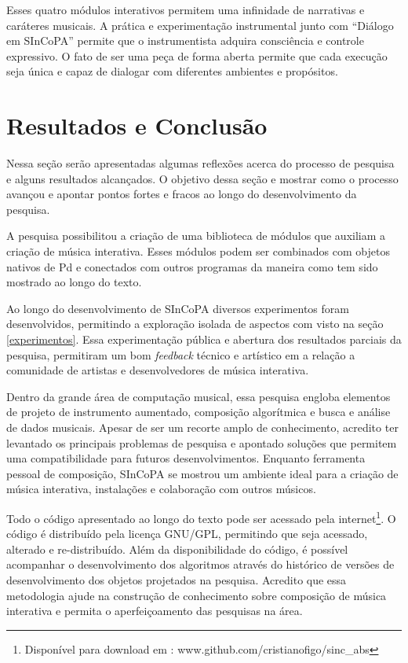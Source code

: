 \documentclass[draft]{ppgmus}
\begin{document}
Esses quatro módulos interativos permitem uma infinidade de narrativas e caráteres musicais.
A prática e experimentação instrumental junto com ``Diálogo em SInCoPA'' permite que o instrumentista 
adquira consciência e controle expressivo. O fato de ser uma peça de forma aberta permite que
cada execução seja única e capaz de dialogar com diferentes ambientes e propósitos.




\chapter{Resultados e Conclusão}
\label{sec:conclusao}

Nessa seção serão apresentadas algumas reflexões acerca
do processo de pesquisa e alguns resultados alcançados.
O objetivo dessa seção e mostrar como o processo avançou
e apontar pontos fortes e fracos ao longo do desenvolvimento da pesquisa.

A pesquisa possibilitou a criação de uma biblioteca de módulos que auxiliam
a criação de música interativa.	Esses módulos podem ser combinados com objetos
nativos de Pd e conectados com outros programas da maneira como tem sido
mostrado ao longo do texto.

Ao longo do desenvolvimento de SInCoPA diversos experimentos foram desenvolvidos,
permitindo a exploração isolada de aspectos com visto na seção \ref{experimentos}.
Essa experimentação pública e abertura dos resultados parciais da pesquisa, permitiram
um bom \textit{feedback} técnico e artístico em a relação a comunidade de 
artistas e desenvolvedores de música interativa.


Dentro da grande área de computação musical, essa pesquisa engloba elementos de projeto
de instrumento aumentado, composição algorítmica e busca e análise de dados musicais.
Apesar de ser um recorte amplo de conhecimento, acredito ter levantado os principais
problemas de pesquisa e apontado soluções que permitem uma compatibilidade para futuros desenvolvimentos.
Enquanto ferramenta pessoal de composição, SInCoPA se mostrou um ambiente ideal
para a criação de música interativa, instalações e colaboração com outros
músicos.

Todo o código apresentado ao longo do texto pode ser acessado pela internet\footnote{Disponível
para download em : www.github.com/cristianofigo/sinc\_abs}. O código é distribuído
pela licença GNU/GPL, permitindo que seja acessado, alterado e re-distribuído.
Além da disponibilidade do código, é possível acompanhar o desenvolvimento dos
algoritmos através do histórico de versões de desenvolvimento dos objetos projetados
na pesquisa. Acredito que essa metodologia ajude na construção de conhecimento sobre
composição de música interativa e permita o aperfeiçoamento das pesquisas na área.
\end{document}
